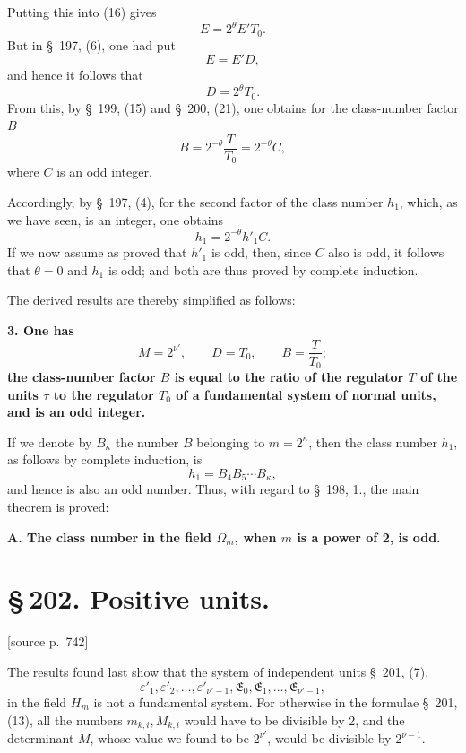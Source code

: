 \documentclass[11pt]{article}
\newcommand{\srcpage}[1]{\par\medskip\noindent\textsf{[source p.~#1]}\par\smallskip}
\begin{document}
Putting this into (16) gives
\[
E=2^\theta E'T_0.
\]
But in \S~197, (6), one had put
\[
E=E'D,
\]
and hence it follows that
\[
D=2^\theta T_0.
\]
From this, by \S~199, (15) and \S~200, (21), one obtains for the class-number factor $B$
\begin{equation}
B=2^{-\theta}\frac{T}{T_0}=2^{-\theta}C,
\tag{24}
\end{equation}
where $C$ is an odd integer.

Accordingly, by \S~197, (4), for the second factor of the class number $h_1$, which, as we have seen, is an integer, one obtains
\begin{equation}
h_1=2^{-\theta}h'_1C.
\tag{25}
\end{equation}
If we now assume as proved that $h'_1$ is odd, then, since $C$ also is odd, it follows that $\theta=0$ and $h_1$ is odd; and both are thus proved by complete induction.

The derived results are thereby simplified as follows:

\begin{center}\textbf{3. One has}
\[
M=2^{\nu'},\qquad D=T_0,
\qquad B=\frac{T}{T_0};
\tag{26}
\]
\textbf{the class-number factor $B$ is equal to the ratio of the regulator $T$ of the units $\tau$ to the regulator $T_0$ of a fundamental system of normal units, and is an odd integer.}\end{center}

If we denote by $B_\kappa$ the number $B$ belonging to $m=2^\kappa$, then the class number $h_1$, as follows by complete induction, is
\begin{equation}
h_1=B_4B_5\cdots B_\kappa,
\tag{27}
\end{equation}
and hence is also an odd number. Thus, with regard to \S~198, 1., the main theorem is proved:

\begin{center}\textbf{A. The class number in the field $\Omega_m$, when $m$ is a power of 2, is odd.}\end{center}

\section*{\S\,202. Positive units.}

\srcpage{742}
The results found last show that the system of independent units \S~201, (7),
\[
\varepsilon'_1,\varepsilon'_2,\ldots,\varepsilon'_{\nu'-1},\mathfrak E_0,\mathfrak E_1,\ldots,\mathfrak E_{\nu'-1},
\]
in the field $H_m$ is not a fundamental system. For otherwise in the formulae \S~201, (13), all the numbers $m_{k,i},M_{k,i}$ would have to be divisible by 2, and the determinant $M$, whose value we found to be $2^{\nu'}$, would be divisible by $2^{\nu-1}$.
\end{document}
